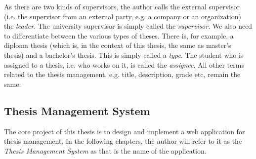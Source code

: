 As there are two kinds of supervisors, the author calls the external supervisor (i.e. the supervisor from an external party, e.g. a company or an organization) the \emph{leader}. The university supervisor is simply called the \emph{supervisor}. We also need to differentiate between the various types of theses. There is, for example, a diploma thesis (which is, in the context of this thesis, the same as master's thesis) and a bachelor's thesis. This is simply called a \emph{type}. The student who is assigned to a thesis, i.e. who works on it, is called the \emph{assignee}. All other terms related to the thesis management, e.g. title, description, grade etc, remain the same.

\subsection{Thesis Management System}

The core project of this thesis is to design and implement a web application for thesis management. In the following chapters, the author will refer to it as the \emph{Thesis Management System} as that is the name of the application.